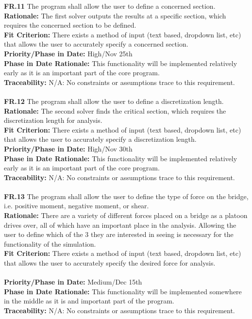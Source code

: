 \documentclass[12pt]{article}
\begin{document}
  \noindent\textbf{FR.11} The program shall allow the user to define a concerned section.\\
  \textbf{Rationale:} The first solver outputs the results at a specific section, which requires the concerned section to be defined.\\
  \textbf{Fit Criterion:} There exists a method of input (text based, dropdown list, etc) that allows the user to accurately specify a concerned section.\\
  \textbf{Priority/Phase in Date:} High/Nov 25th\\
  \textbf{Phase in Date Rationale:} This functionality will be implemented relatively early as it is an important part of the core program.\\
  \textbf{Traceability:} N/A: No constraints or assumptions trace to this requirement.\\\\

  \noindent\textbf{FR.12} The program shall allow the user to define a discretization length.\\
  \textbf{Rationale:} The second solver finds the critical section, which requires the discretization length for analysis.\\
  \textbf{Fit Criterion:} There exists a method of input (text based, dropdown list, etc) that allows the user to accurately specify a discretization length.\\
  \textbf{Priority/Phase in Date:} High/Nov 30th\\
  \textbf{Phase in Date Rationale:} This functionality will be implemented relatively early as it is an important part of the core program.\\
  \textbf{Traceability:} N/A: No constraints or assumptions trace to this requirement.\\\\

  \noindent\textbf{FR.13} The program shall allow the user to define the type of force on the bridge, i.e. positive moment, negative moment, or shear.\\
  \textbf{Rationale:} There are a variety of different forces placed on a bridge as a platoon drives over, all of which have an important place in the analysis. Allowing the user to define which of the 3 they are interested in seeing is necessary for the functionality of the simulation.\\
  \textbf{Fit Criterion:} There exists a method of input (text based, dropdown list, etc) that allows the user to accurately specify the desired force for analysis.\\\\
  \textbf{Priority/Phase in Date:} Medium/Dec 15th\\
  \textbf{Phase in Date Rationale:} This functionality will be implemented somewhere in the middle as it is and important part of the program.\\
  \textbf{Traceability:} N/A: No constraints or assumptions trace to this requirement.\\\\
\end{document}

